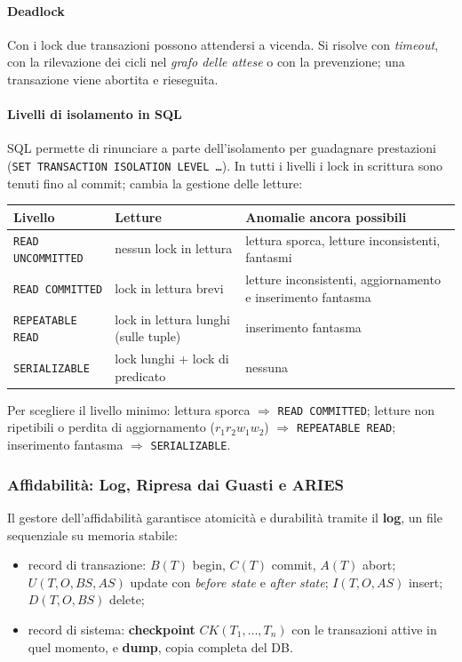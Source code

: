 \documentclass[12pt]{extarticle}
\begin{document}
\paragraph{Deadlock}
Con i lock due transazioni possono attendersi a vicenda. Si risolve con \textit{timeout}, con la rilevazione dei cicli nel \textit{grafo delle attese} o con la prevenzione; una transazione viene abortita e rieseguita.

\paragraph{Livelli di isolamento in SQL}
SQL permette di rinunciare a parte dell'isolamento per guadagnare prestazioni (\texttt{SET TRANSACTION ISOLATION LEVEL \dots}). In tutti i livelli i lock in scrittura sono tenuti fino al commit; cambia la gestione delle letture:
\begin{center}
\small
\begin{tabular}{llp{6.2cm}}
    \toprule
    \textbf{Livello} & \textbf{Letture} & \textbf{Anomalie ancora possibili} \\
    \midrule
    \texttt{READ UNCOMMITTED} & nessun lock in lettura & lettura sporca, letture inconsistenti, fantasmi \\
    \texttt{READ COMMITTED} & lock in lettura brevi & letture inconsistenti, aggiornamento e inserimento fantasma \\
    \texttt{REPEATABLE READ} & lock in lettura lunghi (sulle tuple) & inserimento fantasma \\
    \texttt{SERIALIZABLE} & lock lunghi + lock di predicato & nessuna \\
    \bottomrule
\end{tabular}
\end{center}
Per scegliere il livello minimo: lettura sporca $\Rightarrow$ \texttt{READ COMMITTED}; letture non ripetibili o perdita di aggiornamento ($r_1 r_2 w_1 w_2$) $\Rightarrow$ \texttt{REPEATABLE READ}; inserimento fantasma $\Rightarrow$ \texttt{SERIALIZABLE}.

\subsubsection{Affidabilità: Log, Ripresa dai Guasti e ARIES}

\noindent Il gestore dell'affidabilità garantisce atomicità e durabilità tramite il \textbf{log}, un file sequenziale su memoria stabile:
\begin{itemize}
    \item record di transazione: $B(T)$ begin, $C(T)$ commit, $A(T)$ abort; $U(T,O,BS,AS)$ update con \textit{before state} e \textit{after state}; $I(T,O,AS)$ insert; $D(T,O,BS)$ delete;
    \item record di sistema: \textbf{checkpoint} $CK(T_1,\dots,T_n)$ con le transazioni attive in quel momento, e \textbf{dump}, copia completa del DB.
\end{itemize}
\end{document}
